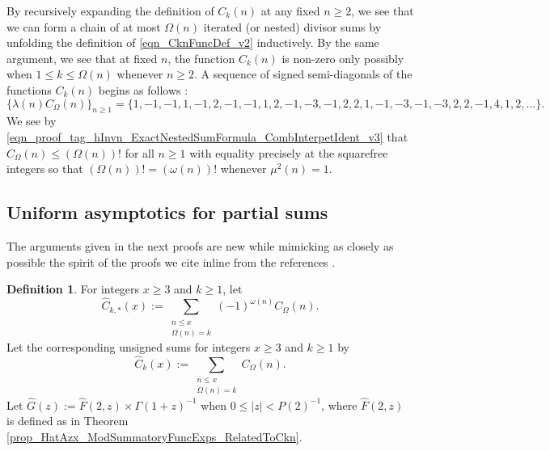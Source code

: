 \documentclass[11pt,reqno,a4letter]{article}
\newcommand{\hlocalref}[1]{\hyperref[#1]{\ref{#1}}}
\numberwithin{equation}{section}
\numberwithin{figure}{section}
\numberwithin{table}{section}
\newcommand{\seqnum}[1]{\href{http://oeis.org/#1}{\color{ProcessBlue}{\underline{#1}}}}
\theoremstyle{plain}
\numberwithin{theorem}{section}
\theoremstyle{definition}
\newtheorem{definition}[theorem]{Definition}
\begin{document}
By recursively expanding the definition of $C_k(n)$ 
at any fixed $n \geq 2$, we see that 
we can form a chain of at most $\Omega(n)$ iterated (or nested) divisor sums by 
unfolding the definition of \eqref{eqn_CknFuncDef_v2} inductively. 
By the same argument, we see that at fixed $n$, the function 
$C_k(n)$ is non-zero only possibly when 
$1 \leq k \leq \Omega(n)$ whenever $n \geq 2$. 
A sequence of signed semi-diagonals of the functions $C_k(n)$ begins as follows 
\cite[\seqnum{A008480}]{OEIS}: 
\[
\{\lambda(n) C_{\Omega}(n) \}_{n \geq 1} = \{
     1, -1, -1, 1, -1, 2, -1, -1, 1, 2, -1, -3, -1, 2, 2, 1, -1, -3, -1, 
     -3, 2, 2, -1, 4, 1, 2, \ldots \}. 
\]
We see by 
\eqref{eqn_proof_tag_hInvn_ExactNestedSumFormula_CombInterpetIdent_v3} 
that $C_{\Omega}(n) \leq (\Omega(n))!$ for all $n \geq 1$ with 
equality precisely at the squarefree integers so that 
$(\Omega(n))! = (\omega(n))!$ whenever $\mu^2(n) = 1$. 

\subsection{Uniform asymptotics for partial sums}
\label{subSection_Section4_AnalyticPrerequisiteProofsOfUniformBoundsOnCertainPartialSumTypes_v1} 

The arguments given in the next proofs are  
new while mimicking as closely as possible the 
spirit of the proofs we cite inline from the references \cite{MV,TENENBAUM-PROBNUMT-METHODS}. 

\begin{definition}
For integers $x \geq 3$ and $k \geq 1$, let 
\[
\widehat{C}_{k,\ast}(x) := \sum_{\substack{n \leq x \\ \Omega(n) = k}} 
     (-1)^{\omega(n)} C_{\Omega}(n). 
\]
Let the corresponding unsigned sums for integers $x \geq 3$ and $k \geq 1$ by 
\[
\widehat{C}_k(x) := \sum_{\substack{n \leq x \\ \Omega(n) = k}} C_{\Omega}(n). 
\]
Let $\widehat{G}(z) := \widehat{F}(2, z) \times \Gamma(1+z)^{-1}$ when 
$0 \leq |z| < P(2)^{-1}$, where $\widehat{F}(2, z)$ is defined as 
in Theorem \hlocalref{prop_HatAzx_ModSummatoryFuncExps_RelatedToCkn}. 
\end{definition}
\end{document}
